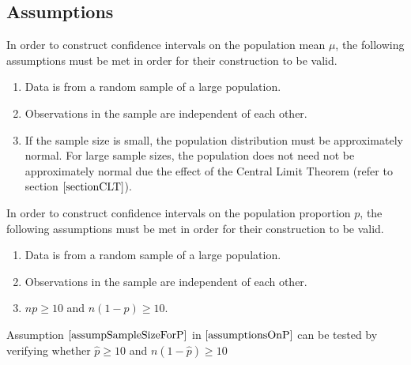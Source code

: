 \subsection{Assumptions}


\begin{assumptions}
In order to construct confidence intervals on the population mean $\mu$, 
the following assumptions must be met in order for their construction to be valid.

\begin{enumerate}
\item Data is from a random sample of a large population.			
\item Observations in the sample are independent of each other.	
\item If the sample size is small, the population distribution must be approximately normal. For large sample sizes, the population does not need not be approximately normal due the effect of the Central Limit Theorem (refer to section $\ref{sectionCLT}$).
\end{enumerate}

\end{assumptions}





\begin{assumptions}\label{assumptionsOnP}

In order to construct confidence intervals on the population proportion $p$, 
the following assumptions must be met in order for their construction to be valid.

\begin{enumerate}
\item Data is from a random sample of a large population.
\item Observations in the sample are independent of each other.
\item	$np \geq 10$ and $n(1-p) \geq 10$.	\label{assumpSampleSizeForP}
\end{enumerate}

\end{assumptions}

\begin{nt}
Assumption $\ref{assumpSampleSizeForP}$ in $\ref{assumptionsOnP}$
can be tested by verifying whether $\hat{p} \geq 10$ and $n (1 - \hat{p}) \geq 10$\
\end{nt}



